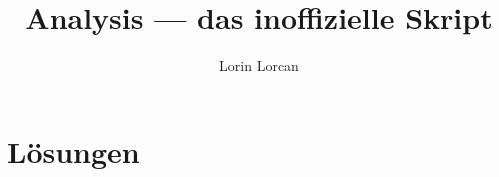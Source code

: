 \documentclass[10pt,a4paper]{scrartcl}
\title{Analysis --- das inoffizielle Skript}
\author{Lorin Lorcan}
\date{}
\begin{document}


\tableofcontents
\pagebreak


\bigskip\bigskip












\pagebreak
\section{Lösungen}
\printsolutions
\end{document}
